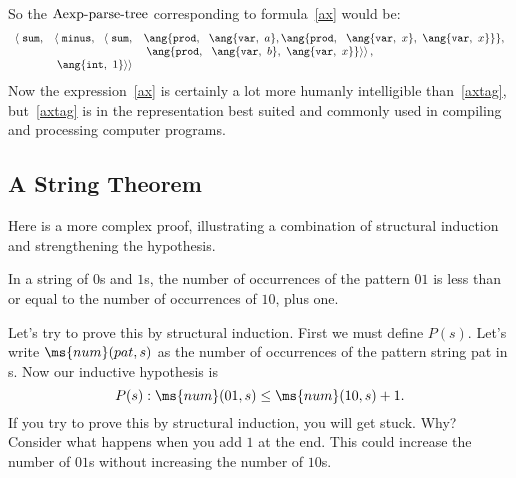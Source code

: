 \begin{definition}
\begin{editingnotes}
So the $\text{Aexp-parse-tree}$ corresponding to formula~\ref{ax} would be:
\begin{equation}\label{axtag}
\begin{array}{rll}
\left< \right. \texttt{sum}, 
         & \left< \right. \texttt{minus},\ \ \left< \right. \texttt{sum},
               & \ang{\texttt{prod},\ \ \ang{\texttt{var},\ a},
                                     \ang{\texttt{prod},\ \
                                            \ang{\texttt{var},\ x},\
                                            \ang{\texttt{var},\ x}}},\\
                               && \left. \left. \ang{\texttt{prod},\ \
                                       \ang{\texttt{var},\ b},\
                                       \ang{\texttt{var},\ x}}
                                   \right> \right>,\\
         & \left. \left. \ang{\texttt{int},\ 1} \right> \right>
\end{array}
\end{equation}
Now the expression~\ref{ax} is certainly a lot more humanly
intelligible than~\ref{axtag}, but~\ref{axtag} is in the
representation best suited and commonly used in compiling and
processing computer programs.

\end{editingnotes}


\begin{editingnotes}

\subsection{A String Theorem}

Here is a more complex proof, illustrating a combination of structural
induction and strengthening the hypothesis.

\begin{theorem}
  In a string of $0$s and $1$s, the number of occurrences of the pattern
  $01$ is less than or equal to the number of occurrences of $10$, plus
  one.
\end{theorem}

Let's try to prove this by structural induction.  First we must
define $P(s)$.  Let's write $\ms{num}(pat,s)$ as the number of
occurrences of the pattern string pat in s.  Now our inductive
hypothesis is
\[
P(s): \ms{num}(01,s) \leq \ms{num}(10,s) + 1. 
\]
If you try to prove this by structural induction, you will get
stuck.
Why? 
Consider what happens when you add $1$ at the end.  
This could increase the number of $01$s without increasing the number of
$10$s. 


\end{editingnotes}
\end{definition}
